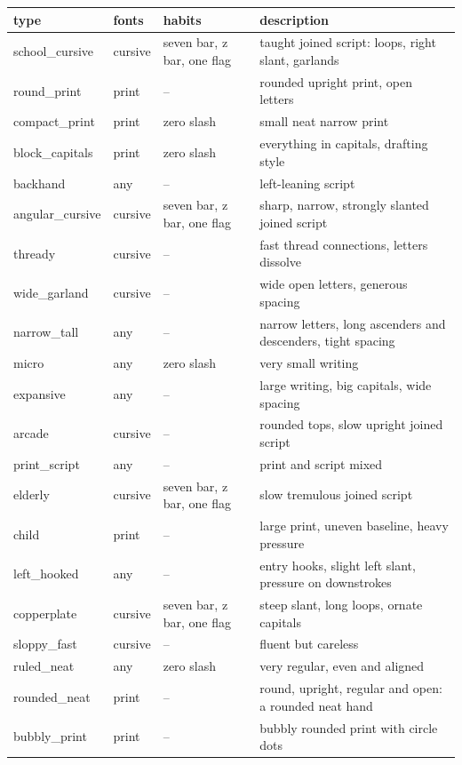 \clearpage
\begin{table}[h]\centering\footnotesize
\begin{tabular}{lllp{}}\toprule type & fonts & habits & description\\\midrule
school\_cursive & cursive & seven bar, z bar, one flag & taught joined script: loops, right slant, garlands\\
round\_print & print & -- & rounded upright print, open letters\\
compact\_print & print & zero slash & small neat narrow print\\
block\_capitals & print & zero slash & everything in capitals, drafting style\\
backhand & any & -- & left-leaning script\\
angular\_cursive & cursive & seven bar, z bar, one flag & sharp, narrow, strongly slanted joined script\\
thready & cursive & -- & fast thread connections, letters dissolve\\
wide\_garland & cursive & -- & wide open letters, generous spacing\\
narrow\_tall & any & -- & narrow letters, long ascenders and descenders, tight spacing\\
micro & any & zero slash & very small writing\\
expansive & any & -- & large writing, big capitals, wide spacing\\
arcade & cursive & -- & rounded tops, slow upright joined script\\
print\_script & any & -- & print and script mixed\\
elderly & cursive & seven bar, z bar, one flag & slow tremulous joined script\\
child & print & -- & large print, uneven baseline, heavy pressure\\
left\_hooked & any & -- & entry hooks, slight left slant, pressure on downstrokes\\
copperplate & cursive & seven bar, z bar, one flag & steep slant, long loops, ornate capitals\\
sloppy\_fast & cursive & -- & fluent but careless\\
ruled\_neat & any & zero slash & very regular, even and aligned\\
rounded\_neat & print & -- & round, upright, regular and open: a rounded neat hand\\
bubbly\_print & print & -- & bubbly rounded print with circle dots\\

\end{tabular}
\end{table}
